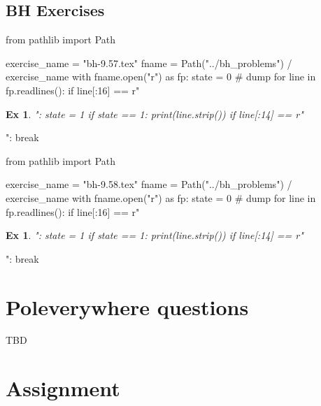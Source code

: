 \documentclass[a4paper,11pt]{article}
\newtheorem{exercise}[theorem]{Ex}
\begin{document}
\subsection{BH Exercises}
\label{sec:bh-exercises-1}

\begin{pycode}
from pathlib import Path

exercise_name = "bh-9.57.tex"
fname = Path("../bh_problems") / exercise_name
with fname.open("r") as fp:
    state = 0  # dump
    for line in fp.readlines():
        if line[:16] == r"\begin{exercise}":
            state = 1
        if state == 1:
            print(line.strip())
        if line[:14] == r"\end{exercise}":
            break
\end{pycode}


\begin{pycode}
from pathlib import Path

exercise_name = "bh-9.58.tex"
fname = Path("../bh_problems") / exercise_name
with fname.open("r") as fp:
    state = 0  # dump
    for line in fp.readlines():
        if line[:16] == r"\begin{exercise}":
            state = 1
        if state == 1:
            print(line.strip())
        if line[:14] == r"\end{exercise}":
            break
\end{pycode}



\section{Poleverywhere questions}
\label{sec:polev-quest}


TBD


\section{Assignment}
\label{sec:assignment}

%





\end{document}
